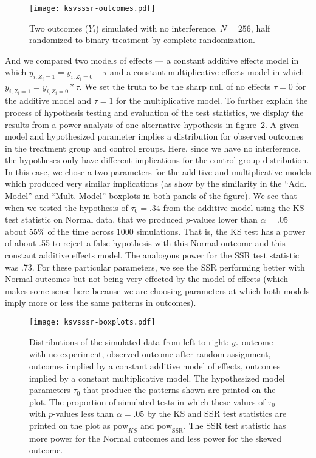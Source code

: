 \begin{figure}[H]\centering
  \texttt{[image: ksvsssr-outcomes.pdf]}
  \caption{Two outcomes ($Y_i$) simulated with no interference, $N=256$, half
    randomized to binary treatment by complete randomization. }\label{fig:simpleoutcomes}
\end{figure}

And we compared two models of effects --- a constant additive effects model in
which $y_{i,Z_i=1}=y_{i,Z_i=0}+\tau$ and a constant multiplicative effects
model in which $y_{i,Z_i=1}=y_{i,Z_i=0}*\tau$. We set the truth to be the
sharp null of no effects $\tau=0$ for the additive model and $\tau=1$ for the
multiplicative model. To further explain the process of hypothesis testing and
evaluation of the test statistics, we display the results from a power
analysis of one alternative hypothesis in figure~\ref{fig:boxplot}. A given
model and hypothesized parameter implies a distribution for observed outcomes
in the treatment group and control groups. Here, since we have no
interference, the hypotheses only have different implications for the control
group distribution. In this case, we chose a two parameters for the additive
and multiplicative models which produced very similar implications (as show by
the similarity in the ``Add. Model'' and ``Mult.  Model'' boxplots in both
panels of the figure). We see that when we tested the hypothesis of
$\tau_0=.34$ from the additive model using the KS test statistic on Normal
data, that we produced $p$-values lower than $\alpha=.05$ about 55\% of the
time across 1000 simulations. That is, the KS test has a power of about .55
to reject a false hypothesis with this Normal outcome and this constant
additive effects model. The analogous power for the SSR test statistic was
.73. For these particular parameters, we see the SSR performing better with
Normal outcomes but not being very effected by the model of effects (which
makes some sense here because we are choosing parameters at which both models
imply more or less the same patterns in outcomes).

\begin{figure}[H]\centering
  \texttt{[image: ksvsssr-boxplots.pdf]}
  \caption{Distributions of the simulated data from left to right: $y_0$
    outcome with no experiment, observed outcome after random assignment,
    outcomes implied by a constant additive model of effects, outcomes implied by a constant
    multiplicative model. The hypothesized model parameters $\tau_0$ that
    produce the patterns shown are printed on the plot. The proportion of
    simulated tests in which these values of $\tau_0$ with $p$-values less
    than $\alpha=.05$ by the KS and SSR test statistics are printed on the plot as $\text{pow}_{KS}$ and
  $\text{pow}_\text{SSR}$. The SSR test statistic has more power for the
  Normal outcomes and less power for the skewed outcome.}\label{fig:boxplot}
\end{figure}

